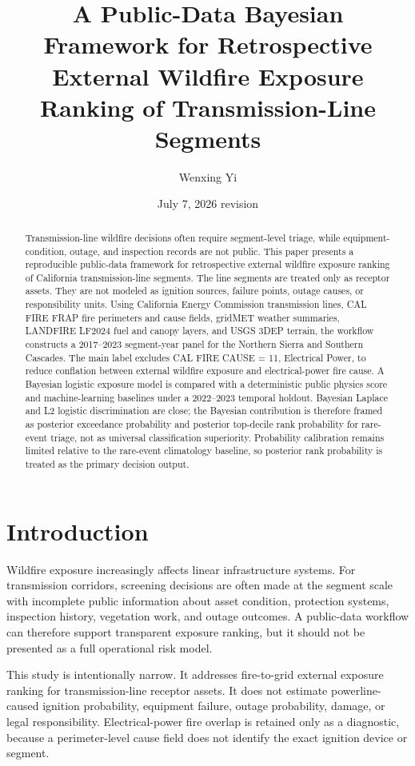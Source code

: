 \documentclass[11pt]{article}
\title{A Public-Data Bayesian Framework for Retrospective External Wildfire Exposure Ranking of Transmission-Line Segments}
\author{Wenxing Yi}
\date{July 7, 2026 revision}
\begin{document}
\maketitle

\begin{abstract}
Transmission-line wildfire decisions often require segment-level triage, while
equipment-condition, outage, and inspection records are not public. This paper
presents a reproducible public-data framework for retrospective external
wildfire exposure ranking of California transmission-line segments. The line
segments are treated only as receptor assets. They are not modeled as ignition
sources, failure points, outage causes, or responsibility units. Using
California Energy Commission transmission lines, CAL FIRE FRAP fire perimeters
and cause fields, gridMET weather summaries, LANDFIRE LF2024 fuel and canopy
layers, and USGS 3DEP terrain, the workflow constructs a 2017--2023
segment-year panel for the Northern Sierra and Southern Cascades. The main
label excludes CAL FIRE CAUSE = 11, Electrical Power, to reduce conflation
between external wildfire exposure and electrical-power fire cause. A Bayesian
logistic exposure model is compared with a deterministic public physics score
and machine-learning baselines under a 2022--2023 temporal holdout. Bayesian
Laplace and L2 logistic discrimination are close; the Bayesian contribution is
therefore framed as posterior exceedance probability and posterior top-decile
rank probability for rare-event triage, not as universal classification
superiority. Probability calibration remains limited relative to the rare-event
climatology baseline, so posterior rank probability is treated as the primary
decision output.
\end{abstract}

\section{Introduction}

Wildfire exposure increasingly affects linear infrastructure systems. For
transmission corridors, screening decisions are often made at the segment scale
with incomplete public information about asset condition, protection systems,
inspection history, vegetation work, and outage outcomes. A public-data
workflow can therefore support transparent exposure ranking, but it should not
be presented as a full operational risk model.

This study is intentionally narrow. It addresses fire-to-grid external exposure
ranking for transmission-line receptor assets. It does not estimate
powerline-caused ignition probability, equipment failure, outage probability,
damage, or legal responsibility. Electrical-power fire overlap is retained only
as a diagnostic, because a perimeter-level cause field does not identify the
exact ignition device or segment.
\end{document}
